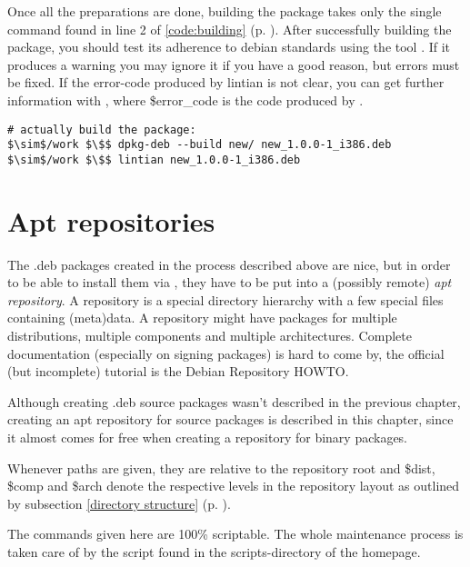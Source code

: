 Once all the preparations are done, building the package takes only the single
command found in line 2 of \lstlistingname{} \ref{code:building} (p.
\pageref{code:building}). After successfully building  the package, you should
test its adherence to debian standards using the tool . If it
produces a warning you may ignore it if you have a good reason, but errors must
be fixed. If the error-code produced by lintian is not clear, you can get
further information with , where 
\$error\_code is the code produced by .
\begin{lstlisting}[label=code:building,caption=creating package, float=ht]
# actually build the package:
$\sim$/work $\$$ dpkg-deb --build new/ new_1.0.0-1_i386.deb
$\sim$/work $\$$ lintian new_1.0.0-1_i386.deb
\end{lstlisting}


\section{Apt repositories}\label{chapter:apt repositories}
The .deb packages created in the process described above are nice, but in order
to be able to install them via , they have to be put into a
(possibly remote) \emph{apt repository}. A repository is a special directory hierarchy
with a few special files containing (meta)data. A repository might have packages
for multiple distributions, multiple components and  multiple architectures.
Complete documentation (especially on signing packages) is hard to come by, the 
official (but incomplete) tutorial is the Debian Repository
HOWTO\cite{debian repository howto}.

Although creating .deb source packages wasn't described in the previous chapter,
creating an apt repository for source packages is described in this chapter, since it
almost comes for free when creating a repository for binary packages.

Whenever paths are given, they are relative to the repository root and \$dist,
\$comp and \$arch denote the respective levels in the repository layout as
outlined by subsection \ref{directory structure} (p. \pageref{directory
structure}).

The commands given here are 100\% scriptable. The whole maintenance process is
taken care of by the script  found in the scripts-directory
of the \tunix{} homepage.

